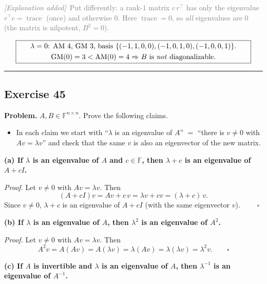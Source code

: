 \documentclass[a4paper,12pt]{article}
\newcommand{\erglerk}{\textcolor{gray}{\small\textit{[Explanation added]}}}
\begin{document}
\erglerk\ \textcolor{gray}{\small Put differently: a rank-$1$ matrix $c\,r^\top$ has only the eigenvalue $r^\top c = \operatorname{trace}$ (once) and otherwise $0$. Here $\operatorname{trace} = 0$, so \emph{all} eigenvalues are $0$ (the matrix is nilpotent, $B^2 = 0$).}

\[
\fbox{\parbox{0.93\textwidth}{\centering
$\lambda = 0$: AM $4$, GM $3$, basis $\{(-1,1,0,0),(-1,0,1,0),(-1,0,0,1)\}$. \\[3pt]
GM$(0) = 3 < {}$AM$(0) = 4 \Rightarrow$ $B$ is \emph{not} diagonalizable.
}}
\]

\bigskip
\hrule
\bigskip

\subsection*{Exercise 45}

\textbf{Problem.} $A, B \in \mathbb{F}^{n\times n}$. Prove the following claims.

\begin{wastun}
\begin{itemize}[leftmargin=*, nosep]
    \item In each claim we start with ``$\lambda$ is an eigenvalue of $A$'' $=$ ``there is $v \neq 0$ with $Av = \lambda v$'' and check that the same $v$ is also an eigenvector of the new matrix.
\end{itemize}
\end{wastun}

\textbf{(a) If $\lambda$ is an eigenvalue of $A$ and $c \in \mathbb{F}$, then $\lambda + c$ is an eigenvalue of $A + cI$.}

\textit{Proof.} Let $v \neq 0$ with $Av = \lambda v$. Then
\[
(A + cI)v = Av + c\,v = \lambda v + c v = (\lambda + c)\,v.
\]
Since $v \neq 0$, $\lambda + c$ is an eigenvalue of $A + cI$ (with the same eigenvector $v$). $\qquad\square$

\textbf{(b) If $\lambda$ is an eigenvalue of $A$, then $\lambda^2$ is an eigenvalue of $A^2$.}

\textit{Proof.} Let $v \neq 0$ with $Av = \lambda v$. Then
\[
A^2 v = A(Av) = A(\lambda v) = \lambda (Av) = \lambda (\lambda v) = \lambda^2 v. \qquad\square
\]

\textbf{(c) If $A$ is invertible and $\lambda$ is an eigenvalue of $A$, then $\lambda^{-1}$ is an eigenvalue of $A^{-1}$.}
\end{document}
